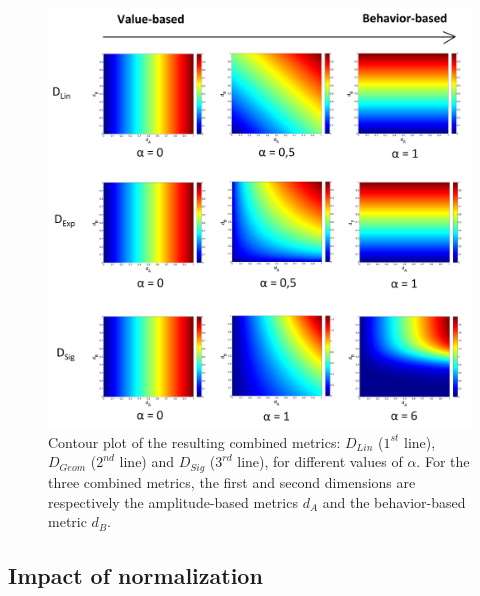 \begin{figure}[h!]
	\centering
	\includegraphics[width=1\linewidth]{images/CombinedMetrics}
	\caption{Contour plot of the resulting combined metrics: $D_{Lin}$ ($1^{st}$ line), $D_{Geom}$ ($2^{nd}$ line) and $D_{Sig}$ ($3^{rd}$ line), for different values of $\alpha$. For the three combined metrics, the first and second dimensions are respectively the amplitude-based metrics $d_A$ and the behavior-based metric $d_B$.}
	\label{fig:ContourLine}
\end{figure}

\subsection{Impact of normalization}

